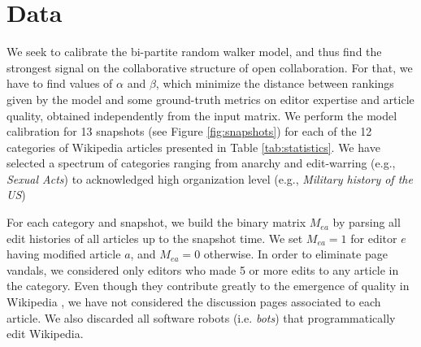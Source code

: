 \section{Data}
We seek to calibrate the bi-partite random walker model, and thus find the strongest signal on the collaborative structure of open collaboration. For that, we have to find values of $\alpha$ and $\beta$, which minimize the distance between rankings given by the model and some ground-truth metrics on editor expertise and article quality, obtained independently from the input matrix. We perform the model calibration for 13 snapshots (see Figure \ref{fig:snapshots})  for each of  the 12 categories of Wikipedia articles presented in Table \nolinebreak \ref{tab:statistics}. We have selected a spectrum of categories ranging from anarchy and edit-warring (e.g., {\it Sexual Acts}) to acknowledged high organization level (e.g., {\it Military history of the US})


For each category and snapshot, we build the binary matrix $M_{ea}$ by parsing all edit histories of all articles up to the snapshot time. We set $M_{ea} = 1$ for editor $e$ having modified article $a$, and $M_{ea} = 0$ otherwise. In order to eliminate page vandals, we considered only editors who made 5 or more edits to any article in the category. Even though they contribute greatly to the emergence of quality in Wikipedia \cite{}, we have not considered the discussion pages associated to each article. We also discarded all software robots (i.e. {\it bots}) that programmatically edit Wikipedia. 

